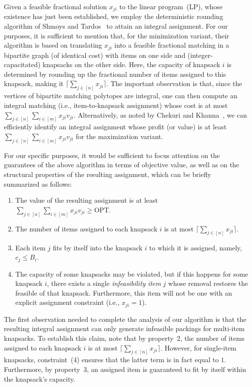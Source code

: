 \documentclass[11pt]{article}
\theoremstyle{plain}
\theoremstyle{definition}
\newcommand{\opt}{\mathrm{OPT}}
\begin{document}
\smallskip {} Given a feasible fractional solution $x_{ji}$ to the linear program~(LP), whose existence has just been established, we employ the deterministic rounding algorithm of Shmoys and Tardos~\cite{ShmoysT93} to attain an integral assignment. For our purposes, it is sufficient to mention that,
for the minimization variant, their algorithm is based on translating $x_{ji}$ into a feasible fractional matching in a bipartite graph (of identical cost) with items on one side and (integer-capacitated) knapsacks on the other side. Here, the capacity of knapsack $i$ is determined by rounding up the fractional number of items assigned to this knapsack, making it $\lceil \sum_{j \in [n]} x_{ji} \rceil$. The important observation is that, since the vertices of bipartite matching polytopes are integral, one can then compute an integral matching (i.e., item-to-knapsack assignment) whose cost is at most $\sum_{j \in [n]} \sum_{i \in [m]} x_{ji} v_{ji}$. Alternatively, as noted by Chekuri and Khanna~\cite{ChekuriK05}, we can efficiently identify an integral assignment whose profit (or value) is at least $\sum_{j \in [n]} \sum_{i \in [m]} x_{ji} v_{ji}$ for the maximization variant.

For our specific purposes, it would be sufficient to focus attention on the guarantees of the above algorithm in terms of objective value, as well as on the structural properties of the resulting assignment, which can be briefly summarized as follows:
\begin{enumerate}
\item The value of the resulting assignment is at least $\sum_{j \in [n]} \sum_{i \in [m]} x_{ji} v_{ji} \geq \opt$.

\item The number of items assigned to each knapsack $i$ is at most $\lceil \sum_{j \in [n]} x_{ji} \rceil$.

\item Each item $j$ fits by itself into the knapsack $i$ to which it is assigned, namely, $c_j \leq B_i$.

\item The capacity of some knapsacks may be violated, but if this happens for some knapsack $i$, there exists a single \textit{infeasibility item} $j$ whose removal restores the feasible of that knapsack. Furthermore, this item will not be one with an explicit assignment constraint (i.e., $x_{ji} = 1$).
\end{enumerate}

 The first observation needed to complete the analysis of our algorithm is that the resulting integral assignment can only generate infeasible packings for multi-item knapsacks. To establish this claim, note that by property~2, the number of items assigned to each knapsack $i$ is at most $\lceil \sum_{j \in [n]} x_{ji} \rceil$. However, for single-item knapsacks, constraint~(4) ensures that the latter term is in fact equal to $1$. Furthermore, by property~3, an assigned item is guaranteed to fit by itself within the knapsack's capacity.
\end{document}
